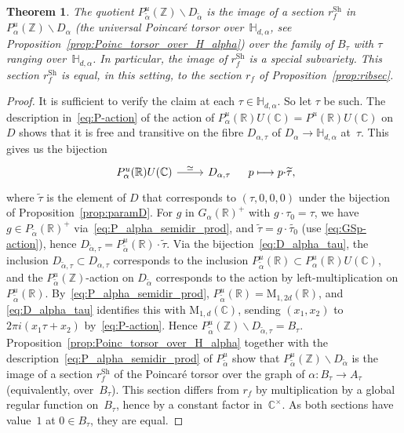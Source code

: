\documentclass[11pt]{article}
\providecommand{\C}{}
\def\mto{\mathchoice{\longmapsto}{\mapsto}{\mapsto}{\mapsto}}
\theoremstyle{plain}
\newtheorem{Theorem}[subsection]{Theorem}
\theoremstyle{definition}
\numberwithin{equation}{subsection}
\renewcommand{\C}{\mathbb C}
\newcommand{\R}{\mathbb R}
\newcommand{\Z}{\mathbb Z}
\renewcommand{\H}{\mathbb H}
\newcommand{\rmM}{\mathrm{M}}
\newcommand{\Sh}{\mathrm{Sh}}
\begin{document}
\begin{Theorem}\label{thm:RibetsectionMSV}
The quotient $P_{\tilde{\alpha}}^u(\Z)\backslash D_{\tilde{\alpha}}$
is the image of a section $r^\Sh_f$ in $P_\alpha^u(\Z)\backslash
D_\alpha$ (the universal Poincaré torsor over~$\H_{d,\alpha}$, see
Proposition~\ref{prop:Poinc_torsor_over_H_alpha}) over the family of
$B_\tau$ with $\tau$ ranging over~$\H_{d,\alpha}$. In particular,
the image of $r^\Sh_f$ is a special subvariety. This section $r^\Sh_f$
is equal, in this setting, to the section $r_f$ of
Proposition~\ref{prop:ribsec}.
\end{Theorem}
\begin{proof}
It is sufficient to verify the claim at each
$\tau\in\H_{d,\alpha}$. So let $\tau$ be such. The description
in~\eqref{eq:P-action} of the action of
$P^u_\alpha(\R)U(\C)=P^u(\R)U(\C)$ on $D$ shows that it is free and
transitive on the fibre $D_{\alpha,\tau}$ of
$D_\alpha\to\H_{d,\alpha}$ at~$\tau$. This gives us the bijection
\begin{equation}\label{eq:D_alpha_tau}
\begin{tikzcd}
P^u_\alpha(\R)U(\C) \ar[r,"\simeq"] & D_{\alpha,\tau}
\end{tikzcd}\,\quad
p\mto p{\cdot}\widetilde{\tau},
\end{equation}
where $\widetilde{\tau}$ is the element of $D$ that corresponds to
$(\tau,0,0,0)$ under the bijection of Proposition~\ref{prop:paramD}.
For $g$ in $G_\alpha(\R)^+$ with $g{\cdot}\tau_0=\tau$, we have $g\in
P_{\widetilde{\alpha}}(\R)^+$ via~\eqref{eq:P_alpha_semidir_prod}, and
$\widetilde{\tau}=g{\cdot}\widetilde{\tau_0}$ (use
\eqref{eq:GSp-action}), hence
$D_{\widetilde{\alpha},\tau}=P^u_{\widetilde{\alpha}}(\R){\cdot}\widetilde{\tau}$.
Via the bijection~\eqref{eq:D_alpha_tau}, the inclusion
$D_{\widetilde{\alpha},\tau}\subset D_{\alpha,\tau}$ corresponds to
the inclusion $P^u_{\widetilde{\alpha}}(\R)\subset
P^u_\alpha(\R)U(\C)$, and the $P^u_{\widetilde{\alpha}}(\Z)$-action on
$D_{\tilde{\alpha}}$ corresponds to the action by left-multiplication
on $P^u_{\widetilde{\alpha}}(\R)$. By~\eqref{eq:P_alpha_semidir_prod},
$P^u_{\widetilde{\alpha}}(\R)=\rmM_{1,2d}(\R)$, and
\eqref{eq:D_alpha_tau} identifies this with $\rmM_{1,d}(\C)$, sending
$(x_1,x_2)$ to $2\pi i(x_1\tau + x_2)$ by~\eqref{eq:P-action}. Hence
$P_{\widetilde{\alpha}}^u(\Z)\backslash
D_{\widetilde{\alpha},\tau}=B_\tau$.
Proposition~\ref{prop:Poinc_torsor_over_H_alpha} together with the
description~\eqref{eq:P_alpha_semidir_prod} of
$P_{\widetilde{\alpha}}^u$ show that
$P_{\tilde{\alpha}}^u(\Z)\backslash D_{\tilde{\alpha}}$ is the image
of a section $r^\Sh_f$ of the Poincaré torsor over the graph of
$\alpha\colon B_\tau\to A_\tau$ (equivalently, over~$B_\tau$). This
section differs from $r_f$ by multiplication by a global regular
function on~$B_\tau$, hence by a constant factor in~$\C^\times$. As
both sections have value~$1$ at $0\in B_\tau$, they are equal.
\end{proof}
\end{document}
